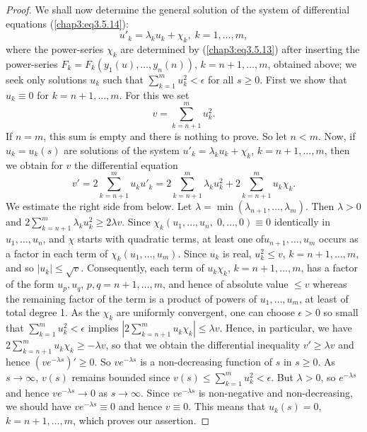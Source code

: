 \begin{proof}
We shall now determine the general solution of the system of
differential equations (\ref{chap3:eq3.5.14}): 
$$
u'_k = \lambda_k u_k + \chi_k, \; k =1 , \ldots, m,
$$
where the power-series $\chi_k$ are determined by
(\ref{chap3:eq3.5.13}) after inserting the power-series $F_k = F_k
(y_1 (u), \ldots, y_n (n))$, $k = n +1 , \ldots, m$, obtained above;
we seek only solutions $u_k$ such that $\sum\limits^m_{k=1} u^2_k <
\epsilon$ for all $s \geq 0$. First we show that $u_k \equiv 0$ for $k
= n+ 1, \ldots, m$. For this we set 
\begin{equation*}
v =\sum\limits^{m}_{k=n+1} u^2_k. \tag{3.5.20}\label{chap3:eq3.5.20} 
\end{equation*}
If $n=m$, this sum is empty and there is nothing to prove. So let $n <
m$. Now, if $u_k = u_k(s)$ are solutions of the system $u'_k =
\lambda_k u_k + \chi_k$, $k = n+1, \ldots, m$, then we obtain for $v$
the differential equation 
$$
v' = 2 \sum\limits^m_{k=n+1} u_k u'_k = 2 \sum\limits^m_{k=n+1}
\lambda_k u^2_k + 2 \sum\limits^m_{k=n+1} u_k \chi_k.  
$$
We estimate the right side from below. Let  $\lambda = \min
(\lambda_{n+1}, \ldots, \lambda_m)$. Then $\lambda > 0$ and $2
\sum\limits^m_{k=n+1} \lambda_k u^2_k \geq 2 \lambda v$. Since $\chi_k
(u_1, \ldots, u_n, \; 0, \ldots,0) \equiv 0$ identically in $u_1,
\ldots, u_n$, and $\chi$ starts with quadratic terms, at least one
of\pageoriginale $u_{n+1}, \ldots, u_m$ occurs as a factor in each
term of $\chi_k(u_1, \ldots, u_m)$. Since $u_k$ is real, $u^2_k \leq
v$, $k = n+1, \ldots, m$, and so $|u_k| \leq \sqrt{v}$. Consequently,
each term of $u_k \chi_k$, $k = n+1, \ldots, m$, has a factor of the
form $u_p, u_q$, $p,q = n +1, \ldots, m$, and hence of absolute value
$\leq v$ whereas the remaining factor of the term is a product of
powers of $u_1,\ldots, u_m$, at least of total degree 1. As the
$\chi_k$ are uniformly convergent, one can choose $\epsilon > 0$ so
small that $\sum\limits^m_{k=1} u^2_k < \epsilon$ implies $|2
\sum\limits^m_{k=n+1} u_k  \chi_k| \leq \lambda v$. Hence, in
particular, we have $2 \sum\limits^m_{k=n+1} u_k \chi_k \geq - \lambda
v$, so that we obtain the differential inequality $v'\geq \lambda v$
and hence $(v e^{-\lambda s})' \geq 0$. So $v e^{-\lambda s}$ is a
non-decreasing function of $s$ in $s \geq 0$. As $s \to \infty$,
$v(s)$ remains bounded since $v(s) \leq \sum\limits^{m}_{k=1} u^2_k <
\epsilon$. But $\lambda > 0$, so $e^{-\lambda s}$ and hence
$ve^{-\lambda s} \to 0$ as $s \to \infty$. Since $ve^{-\lambda s}$ is
non-negative and non-decreasing, we should have $ve^{-\lambda s}
\equiv 0$ and hence $v \equiv 0$. This means that $u_k(s) = 0$, $k=
n+1, \ldots, m$, which proves our assertion. 


\end{proof}
